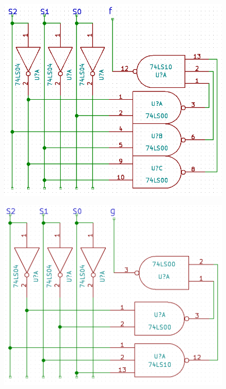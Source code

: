 \documentclass[11pt,a4paper]{article}
\begin{document}
\begin{figure}[H]
    \centering
    \includegraphics[width=6in]{f.png}
\end{figure}
\begin{figure}[H]
    \centering
    \includegraphics[width=6in]{g.png}
\end{figure}
\end{document}
